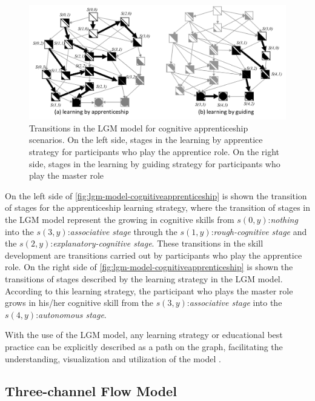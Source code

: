  \begin{figure}[htb]
 \caption[Transitions in the LGM model for cognitive apprenticeship scenarios]{Transitions in the LGM model for cognitive apprenticeship scenarios.
 On the left side, stages in the learning by apprentice strategy for participants who play the apprentice role.
 On the right side, stages in the learning by guiding strategy for participants who play the master role}
 \label{fig:lgm-model-cognitiveapprenticeship}
 \centering
 \includegraphics[width=1\textwidth]{images/chap-model-gmif/lgm-model-cognitiveapprenticeship.png}
\end{figure}

On the left side of \autoref{fig:lgm-model-cognitiveapprenticeship} is shown the transition of stages for the apprenticeship learning strategy, where the transition of stages in the LGM model represent the growing in cognitive skills from $s(0,y)$:\emph{nothing} into the $s(3,y)$:\emph{associative stage} through the $s(1,y)$:\emph{rough-cognitive stage} and the $s(2,y)$:\emph{explanatory-cognitive stage}.
These transitions in the skill development are transitions carried out by participants who play the apprentice role. On the right side of \autoref{fig:lgm-model-cognitiveapprenticeship} is shown the transitions of stages described by the learning strategy  in the LGM model.
According to this learning strategy, the participant who plays the master role grows in his/her cognitive skill from the $s(3,y)$:\emph{associative stage} into the $s(4,y)$:\emph{autonomous stage}.

With the use of the LGM model, any learning strategy or educational best practice can be explicitly described as a path on the graph, facilitating the understanding, visualization and utilization of the model \cite{IsotaniMizoguchiInabaIkeda2010}.

\subsection{Three-channel Flow Model}
\label{subsec:three-channel-flow-model}


